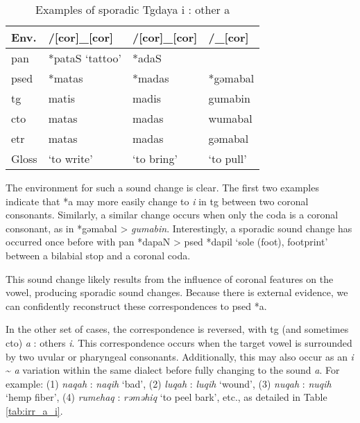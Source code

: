 \begin{table}[!htbp]
\centering
\caption{Examples of sporadic Tgdaya i : other a}
\label{tab:irr_i_a}
\begin{tabular}{llll}
\hline
Env.      & /[cor]\_[cor]   & /[cor]\_[cor] & /\_[cor]  \\ \hline
\ac{pan}  & *pataS `tattoo' & *adaS         &           \\ \hdashline
\ac{psed} & *matas          & *madas        & *gəmabal  \\ \hdashline
\ac{tg}   & matis           & madis         & gumabin   \\
\ac{cto}  & matas           & madas         & wumabal   \\
\ac{etr}  & matas           & madas         & gəmabal   \\ \hline
Gloss     & `to write'      & `to bring'    & `to pull' \\ \hline
\end{tabular}
\end{table}

The environment for such a sound change is clear. The first two examples indicate that *a may more easily change to \textit{i} in \acl{tg} between two coronal consonants. Similarly, a similar change occurs when only the coda is a coronal consonant, as in *gəmabal > \textit{gumabin}. Interestingly, a sporadic sound change has occurred once before with \ac{pan} *dapaN > \ac{psed} *dapil `sole (foot), footprint' between a bilabial stop and a coronal coda.

This sound change likely results from the influence of coronal features on the vowel, producing sporadic sound changes. Because there is external evidence, we can confidently reconstruct these correspondences to \acl{psed} *a.

In the other set of cases, the correspondence is reversed, with \acl{tg} (and sometimes \acl{cto}) \textit{a} : others \textit{i}. This correspondence occurs when the target vowel is surrounded by two uvular or pharyngeal consonants. Additionally, this may also occur as an \textit{i} \~{} \textit{a} variation within the same dialect before fully changing to the sound \textit{a}. For example: (1) \textit{naqah} : \textit{naqih} `bad', (2) \textit{luqah} : \textit{luqih} `wound', (3) \textit{nuqah} : \textit{nuqih} `hemp fiber', (4) \textit{rumehaq} : \textit{rəməhiq} `to peel bark', etc., as detailed in Table \ref{tab:irr_a_i}.

